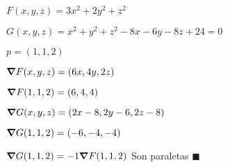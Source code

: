 \documentclass[../practica_04.tex]{subfiles}
\begin{document}
    $ F(x,y,z) = 3x^2+2y^2+z^2 $

    $ G(x,y,z) = x^2+y^2+z^2-8x-6y-8z+24 = 0 $

    $ p=(1,1,2) $

    $ \grad F(x,y,z) = (6x, 4y, 2z) $

    $ \grad F(1,1,2) = (6, 4, 4) $

    $ \grad G(x,y,z) = (2x-8, 2y-6, 2z-8) $

    $ \grad G(1,1,2) = (-6, -4, -4) $

    $ \grad G(1,1,2) = -1\grad F(1,1,2)$ Son paraletas $\blacksquare $
\end{document}
